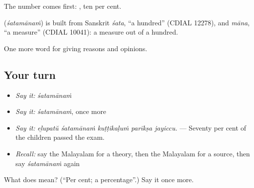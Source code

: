The number comes first:  , ten per cent.

\begin{cousinweb}
\textbf{} (\emph{śatamānaṁ}) is built from Sanskrit \emph{śata}, \textquotedblleft{}a hundred\textquotedblright{} (CDIAL 12278), and \emph{māna}, \textquotedblleft{}a measure\textquotedblright{} (CDIAL 10041): a measure out of a hundred.
\end{cousinweb}

\begin{grammarlens}[title={What you've built}]
One more word for giving reasons and opinions.
\end{grammarlens}

\subsection*{Your turn}
\begin{itemize}
\raggedright
  \item \emph{Say it:} \emph{śatamānaṁ}
  \item \emph{Say it:} \emph{śatamānaṁ}, once more
  \item \emph{Say it:} \emph{eḻupatŭ śatamānaṁ kuṭṭikaḷuṁ parīkṣa jayiccu.} — Seventy per cent of the children passed the exam.
  \item \emph{Recall:} say the Malayalam for a theory, then the Malayalam for a source, then say \emph{śatamānaṁ} again
\end{itemize}

\begin{tcolorbox}[breakable,colback=teal!4,colframe=teal!35!black,title={Before you move on}]
What does  mean? (\textquotedblleft{}Per cent; a percentage\textquotedblright{}.) Say it once more.
\end{tcolorbox}
